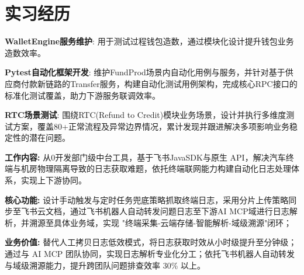 \documentclass{resume}
\begin{document}
\section{实习经历}

\vspace{0.2cm}
\begin{itemize}[parsep=0.2ex]
  {\small 
  \item \textbf{WalletEngine服务维护}: 用于测试过程钱包造数，通过模块化设计提升钱包业务造数效率。
  \vspace{0.1cm}
  \item \textbf{Pytest自动化框架开发}: 维护FundProd场景内自动化用例与服务，并针对基于供应商付款新链路的Transfer服务，构建自动化测试用例架构，完成核心RPC接口的标准化测试覆盖，助力下游服务联调效率。   
  \vspace{0.1cm}
  \item \textbf{RTC场景测试}: 围绕RTC(Refund to Credit)模块业务场景，设计并执行多维度测试方案，覆盖80+正常流程及异常边界情况，累计发现并跟进解决多项影响业务稳定性的潜在问题。}
\end{itemize}

\begin {itemize}
{\small
\item \textbf {工作内容:} 从0开发部门级中台工具，基于飞书JavaSDK与原生 API，解决汽车终端与机房物理隔离导致的日志获取难题，依托终端联网能力构建自动化日志处理体系，实现上下游协同。
\item \textbf {核心功能:}
设计手动触发与定时任务兜底策略抓取终端日志，采用分片上传策略同步至飞书云文档，通过飞书机器人自动转发问题日志至下游AI MCP域进行日志解析，并溯源至具体业务域，实现 "终端采集-云端存储-智能解析-域级溯源"闭环；
\item \textbf {业务价值:} 替代人工拷贝日志低效模式，将日志获取时效从小时级提升至分钟级；通过与 AI MCP 团队协同，实现日志解析专业化分工；依托飞书机器人自动转发与域级溯源能力，提升跨团队问题排查效率 30\% 以上。
}
\end {itemize}
\end{document}
